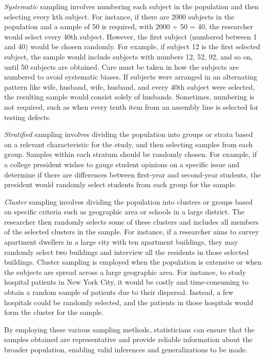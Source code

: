 \documentclass{article}
\begin{document}
\emph{Systematic} sampling involves numbering each subject in the population and then selecting every kth subject. For instance, if there are 2000 subjects in the population and a sample of 50 is required, with 2000 ÷ 50 = 40, the researcher would select every 40th subject. However, the first subject (numbered between 1 and 40) would be chosen randomly. For example, if subject 12 is the first selected subject, the sample would include subjects with numbers 12, 52, 92, and so on, until 50 subjects are obtained. Care must be taken in how the subjects are numbered to avoid systematic biases. If subjects were arranged in an alternating pattern like wife, husband, wife, husband, and every 40th subject were selected, the resulting sample would consist solely of husbands. Sometimes, numbering is not required, such as when every tenth item from an assembly line is selected for testing defects.

\emph{Stratified} sampling involves dividing the population into groups or strata based on a relevant characteristic for the study, and then selecting samples from each group. Samples within each stratum should be randomly chosen. For example, if a college president wishes to gauge student opinions on a specific issue and determine if there are differences between first-year and second-year students, the president would randomly select students from each group for the sample.

\emph{Cluster} sampling involves dividing the population into clusters or groups based on specific criteria such as geographic area or schools in a large district. The researcher then randomly selects some of these clusters and includes all members of the selected clusters in the sample. For instance, if a researcher aims to survey apartment dwellers in a large city with ten apartment buildings, they may randomly select two buildings and interview all the residents in those selected buildings. Cluster sampling is employed when the population is extensive or when the subjects are spread across a large geographic area. For instance, to study hospital patients in New York City, it would be costly and time-consuming to obtain a random sample of patients due to their dispersal. Instead, a few hospitals could be randomly selected, and the patients in those hospitals would form the cluster for the sample.

By employing these various sampling methods, statisticians can ensure that the samples obtained are representative and provide reliable information about the broader population, enabling valid inferences and generalizations to be made.
\end{document}
